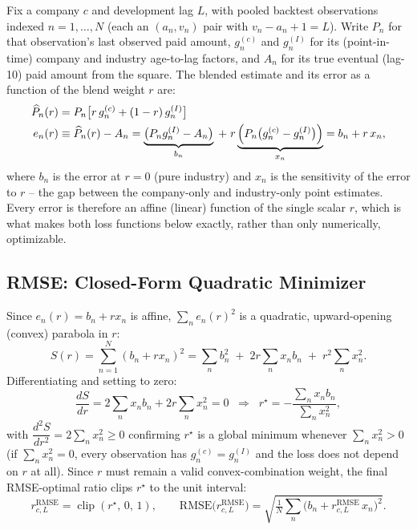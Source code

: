\documentclass[11pt]{article}
\newcommand{\rrmse}{r^{\text{RMSE}}}
\begin{document}
Fix a company $c$ and development lag $L$, with pooled backtest observations indexed
$n = 1, \dots, N$ (each an $(a_n, v_n)$ pair with $v_n - a_n + 1 = L$). Write $P_n$ for that
observation's last observed paid amount, $g^{(c)}_n$ and $g^{(I)}_n$ for its (point-in-time)
company and industry age-to-lag factors, and $A_n$ for its true eventual (lag-10) paid amount
from the square. The blended estimate and its error as a function of the blend weight $r$ are:
\begin{align}
\widehat{P}_n(r) &= P_n \bigl[ r\, g^{(c)}_n + (1-r)\, g^{(I)}_n \bigr] \notag \\
e_n(r) &\equiv \widehat{P}_n(r) - A_n
       = \underbrace{\bigl(P_n g^{(I)}_n - A_n\bigr)}_{b_n} \;+\; r\underbrace{\Bigl(P_n\bigl(g^{(c)}_n - g^{(I)}_n\bigr)\Bigr)}_{x_n}
       = b_n + r\, x_n,
\label{eq:affine-error}
\end{align}
where $b_n$ is the error at $r=0$ (pure industry) and $x_n$ is the sensitivity of the error to
$r$ -- the gap between the company-only and industry-only point estimates. Every error is
therefore an affine (linear) function of the single scalar $r$, which is what makes both loss
functions below exactly, rather than only numerically, optimizable.

\subsection{RMSE: Closed-Form Quadratic Minimizer}

Since $e_n(r) = b_n + r x_n$ is affine, $\sum_n e_n(r)^2$ is a quadratic, upward-opening
(convex) parabola in $r$:
\begin{equation}
S(r) = \sum_{n=1}^{N} (b_n + r x_n)^2 = \sum_n b_n^2 \;+\; 2r\sum_n x_n b_n \;+\; r^2 \sum_n x_n^2.
\end{equation}
Differentiating and setting to zero:
\begin{equation}
\frac{dS}{dr} = 2\sum_n x_n b_n + 2r\sum_n x_n^2 = 0
\;\;\Longrightarrow\;\;
r^\star = -\frac{\sum_n x_n b_n}{\sum_n x_n^2},
\label{eq:rmse-star}
\end{equation}
with $\dfrac{d^2S}{dr^2} = 2\sum_n x_n^2 \ge 0$ confirming $r^\star$ is a global minimum whenever
$\sum_n x_n^2 > 0$ (if $\sum_n x_n^2 = 0$, every observation has $g^{(c)}_n = g^{(I)}_n$ and the
loss does not depend on $r$ at all). Since $r$ must remain a valid convex-combination weight, the
final RMSE-optimal ratio clips $r^\star$ to the unit interval:
\begin{equation}
\rrmse_{c,L} = \operatorname{clip}(r^\star,\,0,\,1), \qquad
\text{RMSE}\bigl(\rrmse_{c,L}\bigr) = \sqrt{\tfrac{1}{N}\textstyle\sum_n \bigl(b_n + \rrmse_{c,L}\, x_n\bigr)^2}.
\label{eq:rmse-clip}
\end{equation}
\end{document}
